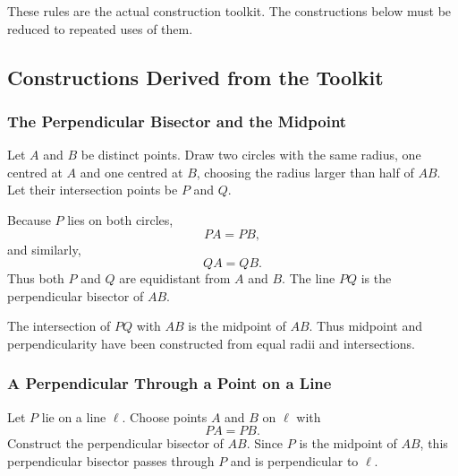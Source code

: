 These rules are the actual construction toolkit. The constructions below must
be reduced to repeated uses of them.

\subsection{Constructions Derived from the Toolkit}

\subsubsection{The Perpendicular Bisector and the Midpoint}

Let $A$ and $B$ be distinct points. Draw two circles with the same radius,
one centred at $A$ and one centred at $B$, choosing the radius larger than half
of $AB$. Let their intersection points be $P$ and $Q$.

Because $P$ lies on both circles,
\[
PA=PB,
\]
and similarly,
\[
QA=QB.
\]
Thus both $P$ and $Q$ are equidistant from $A$ and $B$. The line $PQ$ is the
perpendicular bisector of $AB$.

\begin{center}
\end{center}

The intersection of $PQ$ with $AB$ is the midpoint of $AB$. Thus midpoint and
perpendicularity have been constructed from equal radii and intersections.

\subsubsection{A Perpendicular Through a Point on a Line}

Let $P$ lie on a line $\ell$. Choose points $A$ and $B$ on $\ell$ with
\[
PA=PB.
\]
Construct the perpendicular bisector of $AB$. Since $P$ is the midpoint of
$AB$, this perpendicular bisector passes through $P$ and is perpendicular to
$\ell$.

